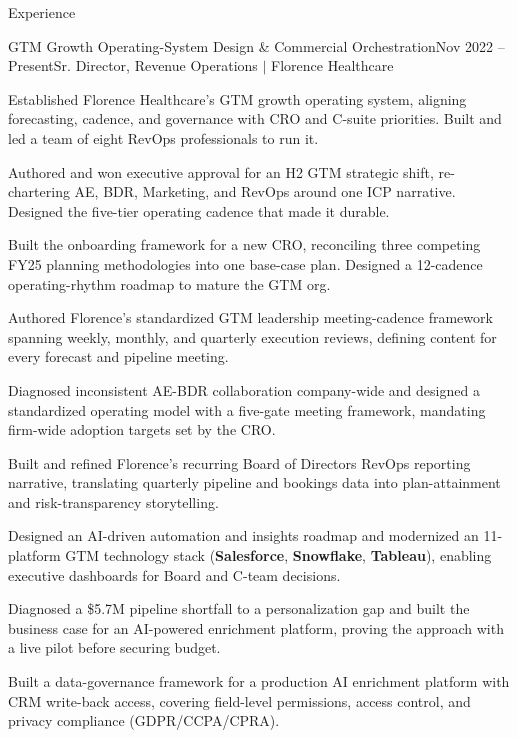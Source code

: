 \documentclass{resume}
\begin{document}
\begin{rSection}{Experience}

\begin{rSubsection}{GTM Growth Operating-System Design \& Commercial Orchestration}{\textcolor{black!60}{Nov 2022 -- Present}}{Sr. Director, Revenue Operations $\vert$ Florence Healthcare}{}
\item Established Florence Healthcare's GTM growth operating system, aligning forecasting, cadence, and governance with CRO and C-suite priorities. Built and led a team of eight RevOps professionals to run it.
\item Authored and won executive approval for an H2 GTM strategic shift, re-chartering AE, BDR, Marketing, and RevOps around one ICP narrative. Designed the five-tier operating cadence that made it durable.
\item Built the onboarding framework for a new CRO, reconciling three competing FY25 planning methodologies into one base-case plan. Designed a 12-cadence operating-rhythm roadmap to mature the GTM org.
\item Authored Florence's standardized GTM leadership meeting-cadence framework spanning weekly, monthly, and quarterly execution reviews, defining content for every forecast and pipeline meeting.
\item Diagnosed inconsistent AE-BDR collaboration company-wide and designed a standardized operating model with a five-gate meeting framework, mandating firm-wide adoption targets set by the CRO.
\item Built and refined Florence's recurring Board of Directors RevOps reporting narrative, translating quarterly pipeline and bookings data into plan-attainment and risk-transparency storytelling.
\item Designed an AI-driven automation and insights roadmap and modernized an 11-platform GTM technology stack (\textbf{Salesforce}, \textbf{Snowflake}, \textbf{Tableau}), enabling executive dashboards for Board and C-team decisions.
\item Diagnosed a \$5.7M pipeline shortfall to a personalization gap and built the business case for an AI-powered enrichment platform, proving the approach with a live pilot before securing budget.
\item Built a data-governance framework for a production AI enrichment platform with CRM write-back access, covering field-level permissions, access control, and privacy compliance (GDPR/CCPA/CPRA).

\end{rSubsection}
\end{rSection}
\end{document}
